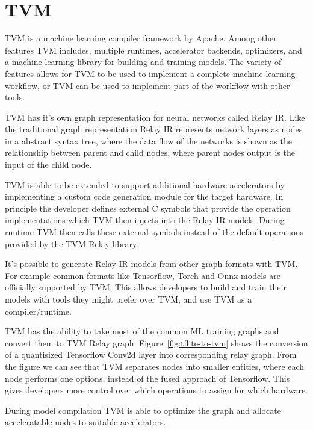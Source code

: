 \documentclass[12pt,a4paper,english
]{tunithesis}
\begin{document}
\section{TVM}
TVM is a machine learning compiler framework by Apache. Among other features TVM includes, multiple runtimes, accelerator backends, optimizers, and a machine learning library for building and training models. The variety of features allows for TVM to be used to implement a complete machine learning workflow, or TVM can be used to implement part of the workflow with other tools.

TVM has it's own graph representation for neural networks called Relay IR. Like the traditional graph representation Relay IR represents network layers as nodes in a abstract syntax tree, where the data flow of the networks is shown as the relationship between parent and child nodes, where parent nodes output is the input of the child node.

TVM is able to be extended to support additional hardware accelerators by implementing a custom code generation module for the target hardware. In principle the developer defines external C symbols that provide the operation implementations which TVM then injects into the Relay IR models. During runtime TVM then calls these external symbols instead of the default operations provided by the TVM Relay library.

It's possible to generate Relay IR models from other graph formats with TVM. For example common formats like Tensorflow, Torch and Onnx models are officially supported by TVM. This allows developers to build and train their models with tools they might prefer over TVM, and use TVM as a compiler/runtime.

TVM has the ability to take most of the common ML training graphs and convert them to TVM Relay graph. Figure~\ref{fig:tflite-to-tvm} shows the conversion of a quantisized Tensorflow Conv2d layer into corresponding relay graph. From the figure we can see that TVM separates nodes into smaller entities, where each node performs one options, instead of the fused approach of Tensorflow. This gives developers more control over which operations to assign for which hardware.

During model compilation TVM is able to optimize the graph and allocate acceleratable nodes to suitable accelerators.~\parencite{TVM}
\end{document}
